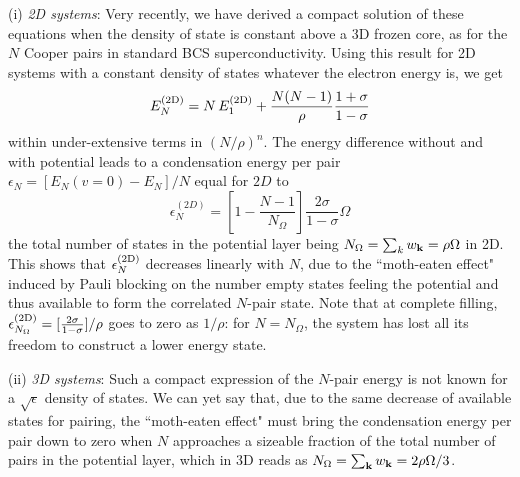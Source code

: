 \documentclass[5p,twocolumn]{elsarticle}
\begin{document}
(i) {\it 2D systems}: Very recently\cite{moth,CombTren}, we have derived a compact solution of these equations when the density of state is constant above a 3D frozen core, as for the $N$ Cooper pairs  in standard BCS superconductivity. Using this result  for 2D systems with a constant density of states whatever the electron energy is, we get
\begin{equation}\label{eq:E2dN}
 E^{{\text{(2D)}}}_N=N\,E^{{\text{(2D)}}}_1+\frac{N(N-1)}{\rho}\frac{1+\sigma}{1-\sigma}
\end{equation}
within under-extensive terms in $(N/\rho)^{n}$.
The energy difference without and with potential
leads to a condensation energy per pair $\epsilon_N= \left[E_N(v=0)-E_N\right]/N$ equal for $2D$ to
  \begin{equation}
\epsilon^{(2D)}_N=\left[1-\frac{N-1}{N_\Omega}\right]\frac{2\sigma}{1-\sigma}\Omega\label{eq:E2D}
\end{equation}
 the total number of states in the potential layer being $N_\Omega=\sum_k{}w_{\mathbf{k}}=\rho\Omega$ in 2D. This shows that $\epsilon^{{\text{(2D)}}}_N$  decreases linearly with $N$, due to the ``moth-eaten effect" induced by Pauli blocking on the number empty states feeling the potential and thus available to form the correlated $N$-pair state.  Note that at complete filling, $
\epsilon^{{\text{(2D)}}}_{N_\Omega}=[\frac{2\sigma}{1-\sigma}]/\rho$ goes to zero as $1/\rho$: for $N=N_\Omega$, the system has lost all its freedom to construct a lower energy state.







(ii) {\it 3D systems}: Such a compact expression of the $N$-pair energy is not known for a $\sqrt{\epsilon}$ density of states. We can yet say that, due to the same decrease of available states for pairing, the ``moth-eaten effect" must bring the condensation energy per pair down to zero when $N$ approaches a sizeable fraction of the total number of pairs in the potential layer, which in 3D reads as $N_\Omega=\sum_{\mathbf{k}}w_{\mathbf{k}}=2\rho \Omega/3$. 
\end{document}
